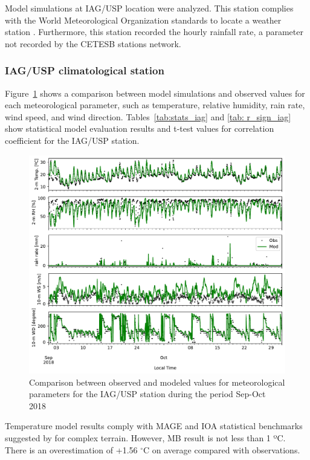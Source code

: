   Model simulations at IAG/USP location were analyzed. 
  This station complies with the World Meteorological Organization standards to locate a weather station \citep{WMO2018}.
  Furthermore, this station recorded the hourly rainfall rate, a parameter not recorded by the CETESB stations network.
  
  \subsubsection{IAG/USP climatological station}
Figure~\ref{fig:met_iag_comp} shows a comparison between model simulations and observed values for each meteorological parameter, such as temperature, relative humidity, rain rate, wind speed, and wind direction.
Tables~\ref{tab:stats_iag} and \ref{tab: r_sign_iag} show statistical model evaluation results and t-test values for correlation coefficient for the IAG/USP station.

\begin{figure}[!hbt]
  \includegraphics[width=1\textwidth]{fig/met_IAG_comparison}
  \caption{Comparison between observed and modeled values for meteorological parameters for the IAG/USP station during the period Sep-Oct 2018}
  \label{fig:met_iag_comp}
\end{figure}

Temperature model results comply with MAGE and IOA statistical benchmarks suggested by \citet{Monk2019} for complex terrain.
However, MB result is not less than 1 ºC.
There is an overestimation of +1.56 $^{\circ}$C on average compared with observations.

